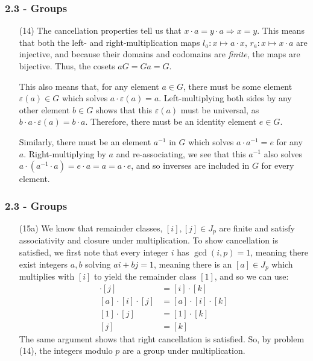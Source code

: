 \documentclass{beamer}
\begin{document}
\begin{frame}
\frametitle{2.3 - Groups}
\small
\begin{enumerate}
	\item[(14)] \quad The cancellation properties tell us that $x\cdot a = y\cdot a\Rightarrow x=y$. This means that both the left- and right-multiplication maps $l_a: x\mapsto a\cdot x$, $r_a: x\mapsto x\cdot a$ are injective, and because their domains and codomains are \textit{finite}, the maps are bijective. Thus, the cosets $aG = Ga = G$. 
	
	\quad This also means that, for any element $a\in G$, there must be some element $\varepsilon(a)\in G$ which solves $a\cdot\varepsilon(a) = a$. Left-multiplying both sides by any other element $b\in G$ shows that this $\varepsilon(a)$ must be universal, as $b\cdot a\cdot \varepsilon(a) = b\cdot a$. Therefore, there must be an identity element $e\in G$.
	
	\quad Similarly, there must be an element $a^{-1}$ in $G$ which solves $a\cdot a^{-1} = e$ for any $a$. Right-multiplying by $a$ and re-associating, we see that this $a^{-1}$ also solves $a\cdot (a^{-1}\cdot a) = e\cdot a = a = a\cdot e$, and so inverses are included in $G$ for every element.
\end{enumerate}
\end{frame}
\begin{frame}
\frametitle{2.3 - Groups}
\small
\begin{enumerate}
	\item[(15a)] We know that remainder classes, $[i],[j]\in J_p$ are finite and satisfy associativity and closure under multiplication. To show cancellation is satisfied, we first note that every integer $i$ has $\gcd\left(i, p\right) = 1$, meaning there exist integers $a,b$ solving $ai + bj = 1$, meaning there is an $[a]\in J_p$ which multiplies with $[i]$ to yield the remainder class $[1]$, and so we can use:
	\begin{align*}
	[i]\cdot[j] &= [i]\cdot[k] \\
	[a]\cdot[i]\cdot[j] &= [a]\cdot[i]\cdot[k] \\
	[1]\cdot[j] &= [1]\cdot[k] \\
	[j] &= [k]
	\end{align*}
	The same argument shows that right cancellation is satisfied. So, by problem (14), the integers modulo $p$ are a group under multiplication.
\end{enumerate}
\end{frame}
\end{document}
